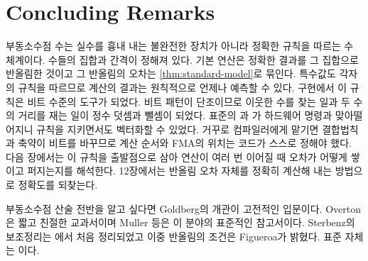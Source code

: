 \section{Concluding Remarks}

부동소수점 수는 실수를 흉내 내는 불완전한 장치가 아니라 정확한 규칙을 따르는 수 체계이다. 수들의 집합과 간격이 정해져 있다. 기본 연산은 정확한 결과를 그 집합으로 반올림한 것이고 그 반올림의 오차는 \cref{thm:standard-model}로 묶인다. 특수값도 각자의 규칙을 따르므로 계산의 결과는 원칙적으로 언제나 예측할 수 있다. 구현에서 이 규칙은 비트 수준의 도구가 되었다. 비트 패턴이 단조이므로 이웃한 수를 찾는 일과 두 수의 거리를 재는 일이 정수 덧셈과 뺄셈이 되었다. 표준의 과 가 하드웨어 명령과 맞아떨어지니 규칙을 지키면서도 벡터화할 수 있었다. 거꾸로 컴파일러에게 맡기면 결합법칙과 축약이 비트를 바꾸므로 계산 순서와 FMA의 위치는 코드가 스스로 정해야 했다. 다음 장에서는 이 규칙을 출발점으로 삼아 연산이 여러 번 이어질 때 오차가 어떻게 쌓이고 퍼지는지를 해석한다. 12장에서는 반올림 오차 자체를 정확히 계산해 내는 방법으로 정확도를 되찾는다.

부동소수점 산술 전반을 알고 싶다면 Goldberg의 개관\cite{goldberg1991}이 고전적인 입문이다. Overton\cite{overton2001}은 짧고 친절한 교과서이며 Muller 등\cite{muller2018handbook}은 이 분야의 표준적인 참고서이다. Sterbenz의 보조정리는 \cite{sterbenz1974}에서 처음 정리되었고 이중 반올림의 조건은 Figueroa\cite{figueroa1995}가 밝혔다. 표준 자체는 \cite{ieee754-2019}이다.

\chapterreferences
